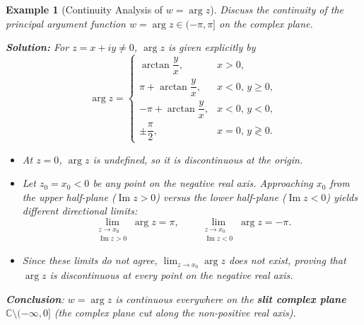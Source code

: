 \documentclass[11pt,a4paper]{article}
\theoremstyle{definitionbreak}
\theoremstyle{examplebreak}
\newtheorem{example}{Example}
\theoremstyle{theorembreak}
\begin{document}
\begin{example}[Continuity Analysis of $w = \arg z$]
Discuss the continuity of the principal argument function $w = \arg z \in (-\pi, \pi]$ on the complex plane.

\textbf{Solution:} For $z = x + iy \neq 0$, $\arg z$ is given explicitly by
\[
    \arg z = \begin{cases}
        \arctan\dfrac{y}{x}, & x > 0, \\[0.9em]
        \pi + \arctan\dfrac{y}{x}, & x < 0, \, y \ge 0, \\[0.9em]
        -\pi + \arctan\dfrac{y}{x}, & x < 0, \, y < 0, \\[0.9em]
        \pm\dfrac{\pi}{2}, & x = 0, \, y \gtrless 0.
    \end{cases}
\]
\begin{itemize}
    \item At $z = 0$, $\arg z$ is undefined, so it is discontinuous at the origin.
    \item Let $z_0 = x_0 < 0$ be any point on the negative real axis. Approaching $x_0$ from the upper half-plane ($\operatorname{Im} z > 0$) versus the lower half-plane ($\operatorname{Im} z < 0$) yields different directional limits:
    \[
        \lim_{\substack{z \to x_0 \\ \operatorname{Im} z > 0}} \arg z = \pi, \qquad \lim_{\substack{z \to x_0 \\ \operatorname{Im} z < 0}} \arg z = -\pi.
    \]
    \item Since these limits do not agree, $\lim_{z \to x_0} \arg z$ does not exist, proving that $\arg z$ is discontinuous at every point on the negative real axis.
\end{itemize}
\textbf{Conclusion}: $w = \arg z$ is continuous everywhere on the \textbf{slit complex plane} $\mathbb{C} \setminus (-\infty, 0]$ (the complex plane cut along the non-positive real axis).
\end{example}
\end{document}
